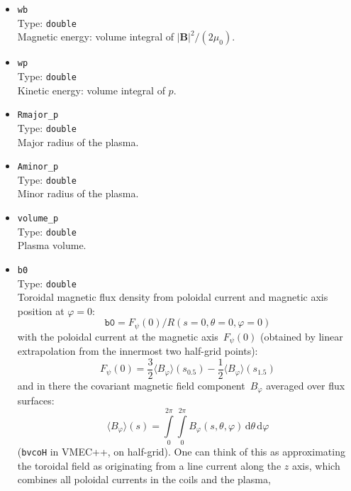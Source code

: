\begin{itemize}
 \item \texttt{wb} \\
       Type: \texttt{double} \\
       Magnetic energy: volume integral of $\vert\mathbf{B}\vert^2/(2 \mu_0)$.
 \item \texttt{wp} \\
       Type: \texttt{double} \\
       Kinetic energy: volume integral of $p$.
 \item \texttt{Rmajor\_p} \\
       Type: \texttt{double} \\
       Major radius of the plasma.
 \item \texttt{Aminor\_p} \\
       Type: \texttt{double} \\
       Minor radius of the plasma.
 \item \texttt{volume\_p} \\
       Type: \texttt{double} \\
       Plasma volume.
 \item \texttt{b0} \\
       Type: \texttt{double} \\
       Toroidal magnetic flux density from poloidal current and magnetic axis position at $\varphi=0$:
       \begin{equation}
        \texttt{b0} = F_\psi(0) / R(s=0, \theta=0, \varphi=0)
       \end{equation}
       with the poloidal current at the magnetic axis~$F_\psi(0)$
       (obtained by linear extrapolation from the innermost two half-grid points):
       \begin{equation}
        F_\psi(0) = \frac{3}{2} \langle B_\varphi \rangle(s_{0.5}) - \frac{1}{2} \langle B_\varphi \rangle(s_{1.5})
       \end{equation}
       and in there the covariant magnetic field component~$B_\varphi$ averaged over flux surfaces:
       \begin{equation}
        \langle B_\varphi \rangle (s)= \int\limits_0^{2 \pi} \int\limits_0^{2 \pi} B_\varphi(s ,\theta, \varphi) \,\mathrm{d}\theta \,\mathrm{d}\varphi
       \end{equation}
       (\texttt{bvcoH} in VMEC++, on half-grid).
       One can think of this as approximating the toroidal field as originating from a line current along the $z$ axis,
       which combines all poloidal currents in the coils and the plasma,

\end{itemize}
